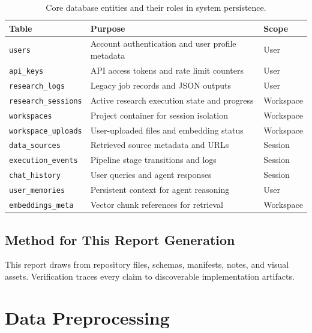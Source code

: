 \documentclass[12pt, a4paper]{article}
\begin{document}
\begin{table}[H]
\centering
\caption{Core database entities and their roles in system persistence.}
\label{tab:db_entities}
\begin{tabular}{p{4.2cm}|p{7.5cm}|p{1.8cm}}
\toprule
\textbf{Table} & \textbf{Purpose} & \textbf{Scope} \\
\midrule
\texttt{users} & Account authentication and user profile metadata & User \\
\texttt{api\_keys} & API access tokens and rate limit counters & User \\
\texttt{research\_logs} & Legacy job records and JSON outputs & User \\
\texttt{research\_sessions} & Active research execution state and progress & Workspace \\
\texttt{workspaces} & Project container for session isolation & Workspace \\
\texttt{workspace\_uploads} & User-uploaded files and embedding status & Workspace \\
\texttt{data\_sources} & Retrieved source metadata and URLs & Session \\
\texttt{execution\_events} & Pipeline stage transitions and logs & Session \\
\texttt{chat\_history} & User queries and agent responses & Session \\
\texttt{user\_memories} & Persistent context for agent reasoning & User \\
\texttt{embeddings\_meta} & Vector chunk references for retrieval & Workspace \\
\bottomrule
\end{tabular}
\end{table}

\subsection{Method for This Report Generation}

This report draws from repository files, schemas, manifests, notes, and visual assets. Verification traces every claim to discoverable implementation artifacts.

\section{Data Preprocessing}
\end{document}
